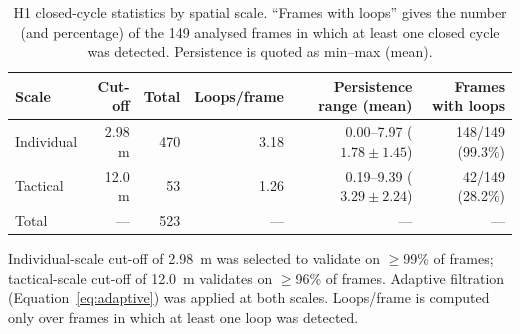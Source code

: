 \documentclass[11pt,a4paper]{article}
\begin{document}
\begin{table}[H]
\centering
\caption{H1 closed-cycle statistics by spatial scale.
  ``Frames with loops'' gives the number (and percentage)
  of the 149 analysed frames in which at least one closed
  cycle was detected.  Persistence is quoted as
  min--max (mean).}
\label{tab:h1stats}
\begin{threeparttable}
\begin{tabular}{@{}lrrrrr@{}}
\toprule
Scale      & Cut-off & Total & Loops/frame  &
             Persistence range (mean) &
             Frames with loops \\
\midrule
Individual & 2.98 m  & 470   & 3.18         &
             0.00--7.97 (\(1.78 \pm 1.45\)) &
             148/149 (99.3\%) \\
Tactical   & 12.0 m  &  53   & 1.26         &
             0.19--9.39 (\(3.29 \pm 2.24\)) &
              42/149 (28.2\%) \\
\midrule
Total      & ---     & 523   & ---          & --- & --- \\
\bottomrule
\end{tabular}
\begin{tablenotes}
\small
\item Individual-scale cut-off of 2.98~m was selected to
  validate on \(\geq\)99\% of frames; tactical-scale
  cut-off of 12.0~m validates on \(\geq\)96\% of frames.
  Adaptive filtration (Equation~\ref{eq:adaptive}) was
  applied at both scales.
  Loops/frame is computed only over frames in which at
  least one loop was detected.
\end{tablenotes}
\end{threeparttable}
\end{table}
\end{document}
